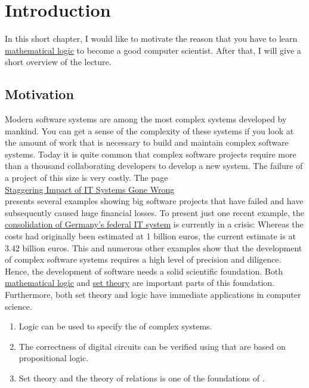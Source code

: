\chapter{Introduction}
In this short chapter, I would like to motivate the reason that you have to learn
\href{https://en.wikipedia.org/wiki/Mathematical_logic}{mathematical logic} to become a  
good computer scientist.  After that, I will give a short overview of the lecture.

\section{Motivation}
Modern software systems are among the most complex systems developed by mankind.  You can get a
sense of the complexity of these systems if you look at the amount of work that is necessary to
build and maintain complex software systems.  Today it is quite common that complex software projects require
more than a thousand collaborating developers to  
develop a new system.  The failure of a project of this size is very costly.
The page
\\[0.2cm]
\hspace*{1.3cm}
\href{http://spectrum.ieee.org/static/the-staggering-impact-of-it-systems-gone-wrong}{Staggering Impact of IT Systems Gone Wrong} 
\\[0.2cm]
presents several examples showing big software projects that have failed and have subsequently caused huge
financial losses.  To present just one recent example, the 
\href{https://www.golem.de/news/rechnungshof-it-konsolidierung-des-bundes-kommt-seit-2018-nicht-voran-1909-143858.html}{consolidation
  of Germany's federal IT system} is currently in a crisis:  Whereas the costs had originally been estimated at
1 billion euros, the current estimate is at 3.42 billion euros.  
This and numerous other examples show that the development of complex software systems requires a high level
of precision and diligence.  Hence, the development of software needs a solid scientific
foundation.  Both \href{https://en.wikipedia.org/wiki/Mathematical_logic}{mathematical logic} and 
\href{https://en.wikipedia.org/wiki/Set_theory}{set theory}
are important parts of this foundation.  Furthermore, both set theory and logic have immediate applications in
computer science. 
\begin{enumerate}
\item Logic can be used to specify the  of complex systems.  
\item The correctness of digital circuits can be verified using  that are based on
      propositional logic.
\item Set theory and the theory of relations is one of the foundations of .
\end{enumerate}
